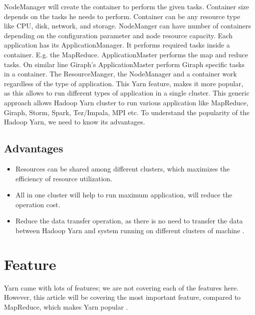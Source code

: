 \documentclass[9pt,twocolumn,twoside]{../../styles/osajnl}
\begin{document}
NodeManager will create the container to perform the given tasks. Container size depends on the tasks he needs to perform. Container can be any resource type like CPU, disk, network, and storage. NodeManger can have number of containers depending on the configuration parameter and node resource capacity. 
Each application has its ApplicationManager. It performs required tasks inside a container. E.g. the MapReduce. ApplicationMaster performs the map and reduce tasks. On similar line Giraph’s ApplicationMaster perform Giraph specific tasks in a container. The ResourceManger, the NodeManager and a container work regardless of the type of application. This Yarn feature, makes it more popular, as this allows to run different types of application in a single cluster. This generic approach allows Hadoop Yarn cluster to run various application like MapReduce, Giraph, Storm, Spark, Tez/Impala, MPI etc. To understand the popularity of the Hadoop Yarn, we need to know its advantages.

\subsection{Advantages} 
\begin{itemize}
	\item Resources can be shared among different clusters, which maximizes the efficiency of resource utilization.
	\item All in one cluster will help to run maximum application, will reduce the operation cost.
	\item Reduce the data transfer operation, as there is no need to transfer the data between Hadoop Yarn and system running on different clusters of machine \cite{www-4}.
\end{itemize}
	
\section{Feature}

Yarn came with lots of features; we are not covering each of the features here. However, this article will be covering the most important feature, compared to MapReduce, which makes Yarn popular \cite{www-4}.
\end{document}
